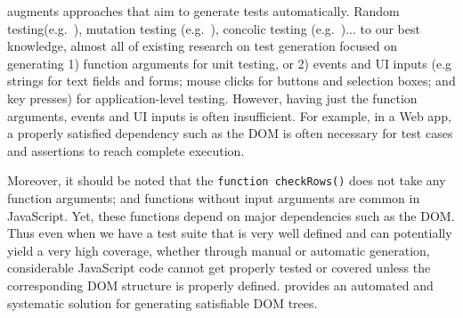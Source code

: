 \tool augments approaches that aim to generate tests automatically.  
Random testing(e.g.~\cite{artemis}), mutation testing (e.g.~\cite{pythia}), concolic testing (e.g.~\cite{eventConcolic, kudzu, jalangi, cute})... 
to our best knowledge, almost all of existing research on test generation focused on generating 1) function arguments for unit testing, or 2) events and UI inputs (e.g strings for text fields and forms; mouse clicks for buttons and selection boxes; and key presses) for application-level testing.
However, having just the function arguments, events and UI inputs is often insufficient.  For example, in a Web app, a properly satisfied dependency such as the DOM is often necessary for test cases and assertions to reach complete execution.  

Moreover, it should be noted that the {\tt function checkRows()} does not take any function arguments; and functions without input arguments are common in JavaScript.
Yet, these functions depend on major dependencies such as the DOM.
Thus even when we have a test suite that is very well defined and can potentially yield a very high coverage, whether through manual or automatic generation, considerable JavaScript code cannot get properly tested or covered unless the corresponding DOM structure is properly defined.  
\tool provides an automated and systematic solution for generating satisfiable DOM trees.  



